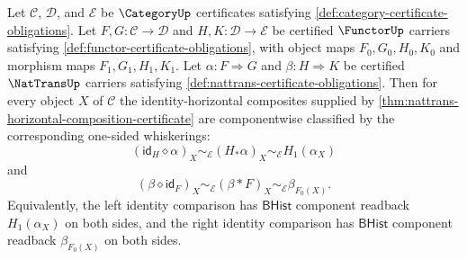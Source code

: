 \begin{theorem}
\label{thm:nattrans-horizontal-identity-reductions}
Let $\mathcal C$, $\mathcal D$, and $\mathcal E$ be $\CategoryUp$ certificates satisfying \autoref{def:category-certificate-obligations}. Let $F,G:\mathcal C\to\mathcal D$ and $H,K:\mathcal D\to\mathcal E$ be certified $\FunctorUp$ carriers satisfying \autoref{def:functor-certificate-obligations}, with object maps $F_0,G_0,H_0,K_0$ and morphism maps $F_1,G_1,H_1,K_1$. Let $\alpha:F\Rightarrow G$ and $\beta:H\Rightarrow K$ be certified $\NatTransUp$ carriers satisfying \autoref{def:nattrans-certificate-obligations}. Then for every object $X$ of $\mathcal C$ the identity-horizontal composites supplied by \autoref{thm:nattrans-horizontal-composition-certificate} are componentwise classified by the corresponding one-sided whiskerings:
$$
(\mathsf{id}_H\diamond\alpha)_X
\sim_{\mathcal E}
(H_{\ast}\alpha)_X
\sim_{\mathcal E}
H_1(\alpha_X)
$$
and
$$
(\beta\diamond\mathsf{id}_F)_X
\sim_{\mathcal E}
(\beta\ast F)_X
\sim_{\mathcal E}
\beta_{F_0(X)}.
$$
Equivalently, the left identity comparison has $\mathsf{BHist}$ component readback $H_1(\alpha_X)$ on both sides, and the right identity comparison has $\mathsf{BHist}$ component readback $\beta_{F_0(X)}$ on both sides.
\end{theorem}
